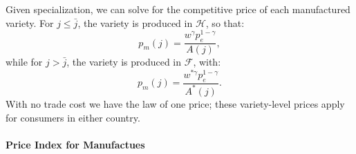 \documentclass[notitlepage,12pt]{article}
\begin{document}
Given specialization, we can solve for the competitive price of each
manufactured variety. For $j\leq \bar{j}$, the variety is produced in $%
\mathcal{H}$, so that:%
\begin{equation}
p_{m}(j)=\frac{w^{\gamma }p_{e}^{1-\gamma }}{A(j)},  \label{pm(j)}
\end{equation}%
while for $j>\bar{j}$, the variety is produced in $\mathcal{F}$, with:%
\begin{equation*}
p_{m}(j)=\frac{w^{\ast \gamma }p_{e}^{1-\gamma }}{A^{\ast }(j)}.
\end{equation*}%
With no trade cost we have the law of one price; these variety-level prices
apply for consumers in either country.

\paragraph{Price Index for Manufactues}
\end{document}
